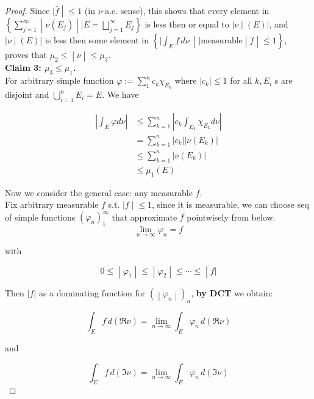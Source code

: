 \begin{proof}
Since \(\left. |\bar{f} \middle| \leq 1 \right.\) (in \(\nu\)-a.e. sense), this shows that every element in \(\left\{ \sum_{j = 1}^{\infty} \middle| \nu(E_{j}) \middle| \mid E = \bigsqcup_{j = 1}^{\infty}E_{j} \right\}\) is less then or equal to \(\left. |\nu \middle| (E)| \right.\), and \(\left. |\nu \middle| (E)| \right.\) is less then some element in \(\left\{ |\int_{E}f\, d\nu\  \middle| \mid \text{measurable} \middle| f \middle| \leq 1 \right\}\), proves that \(\left. \mu_{2} \leq \middle| \nu \middle| \leq \mu_{3} \right.\).\\
\textbf{Claim 3: \(\mu_{3} \leq \mu_{1}\).}\\
For arbitrary simple function \(\varphi := \sum_{1}^{n}c_{k}\chi_{E_{k}}\) where \(\left| c_{k} \right| \leq 1\) for all \(k,E_{i}\) s are disjoint and \(\bigcup_{i = 1}^{n}E_{i} = E\). We have

\[\begin{matrix}
\left| {\int_{E}\varphi d\nu} \right| & {\leq \sum\limits_{k = 1}^{n}\left| {c_{k}\int_{E_{k}}\chi_{E_{k}}d\nu} \right|} \\
 & {= \sum\limits_{k = 1}^{n}\left| c_{k} \right|\left| {\nu\left( E_{k} \right)} \right|} \\
 & {\leq \sum\limits_{k = 1}^{n}\left| {\nu\left( E_{k} \right)} \right|} \\
 & {\leq \mu_{1}(E)}
\end{matrix}\]

Now we consider the general case: any measurable \(f\).\\
Fix arbitrary measurable \(f\) s.t. \(\left. |f \middle| \leq 1 \right.\), since it is measurable, we can choose seq of simple functions \((\varphi_{n})_{1}^{\infty}\) that approximate \(f\) pointwisely from below.\\

\[\lim\limits_{n\rightarrow\infty}\varphi_{n} = f\]

with

\[\left. 0 \leq \middle| \varphi_{1} \middle| \leq \middle| \varphi_{2} \middle| \leq \cdots \leq \middle| f| \right.\]

Then \(|f|\) as a dominating function for \(\left. ( \middle| \varphi_{n} \middle| )_{n} \right.\), \textbf{by DCT} we obtain:

\[\int_{E}f\, d(\Re\nu) = \lim\limits_{n\rightarrow\infty}\int_{E}\varphi_{n}\, d(\Re\nu)\]

and

\[\int_{E}f\, d(\Im\nu) = \lim\limits_{n\rightarrow\infty}\int_{E}\varphi_{n}\, d(\Im\nu)\]


\end{proof}
